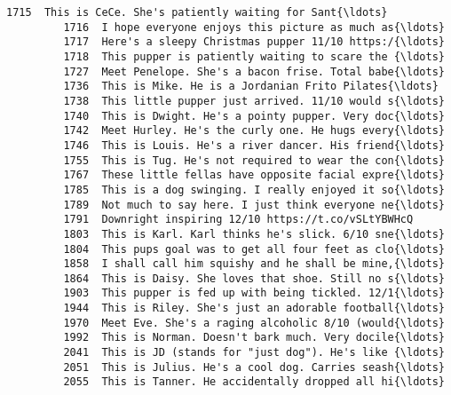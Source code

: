 \documentclass[11pt]{article}
\begin{document}
\begin{Verbatim}[commandchars=\\\{\}]
         1715  This is CeCe. She's patiently waiting for Sant{\ldots}   
         1716  I hope everyone enjoys this picture as much as{\ldots}   
         1717  Here's a sleepy Christmas pupper 11/10 https:/{\ldots}   
         1718  This pupper is patiently waiting to scare the {\ldots}   
         1727  Meet Penelope. She's a bacon frise. Total babe{\ldots}   
         1736  This is Mike. He is a Jordanian Frito Pilates{\ldots}   
         1738  This little pupper just arrived. 11/10 would s{\ldots}   
         1740  This is Dwight. He's a pointy pupper. Very doc{\ldots}   
         1742  Meet Hurley. He's the curly one. He hugs every{\ldots}   
         1746  This is Louis. He's a river dancer. His friend{\ldots}   
         1755  This is Tug. He's not required to wear the con{\ldots}   
         1767  These little fellas have opposite facial expre{\ldots}   
         1785  This is a dog swinging. I really enjoyed it so{\ldots}   
         1789  Not much to say here. I just think everyone ne{\ldots}   
         1791  Downright inspiring 12/10 https://t.co/vSLtYBWHcQ   
         1803  This is Karl. Karl thinks he's slick. 6/10 sne{\ldots}   
         1804  This pups goal was to get all four feet as clo{\ldots}   
         1858  I shall call him squishy and he shall be mine,{\ldots}   
         1864  This is Daisy. She loves that shoe. Still no s{\ldots}   
         1903  This pupper is fed up with being tickled. 12/1{\ldots}   
         1944  This is Riley. She's just an adorable football{\ldots}   
         1970  Meet Eve. She's a raging alcoholic 8/10 (would{\ldots}   
         1992  This is Norman. Doesn't bark much. Very docile{\ldots}   
         2041  This is JD (stands for "just dog"). He's like {\ldots}   
         2051  This is Julius. He's a cool dog. Carries seash{\ldots}   
         2055  This is Tanner. He accidentally dropped all hi{\ldots}   
         

\end{Verbatim}
\end{document}
